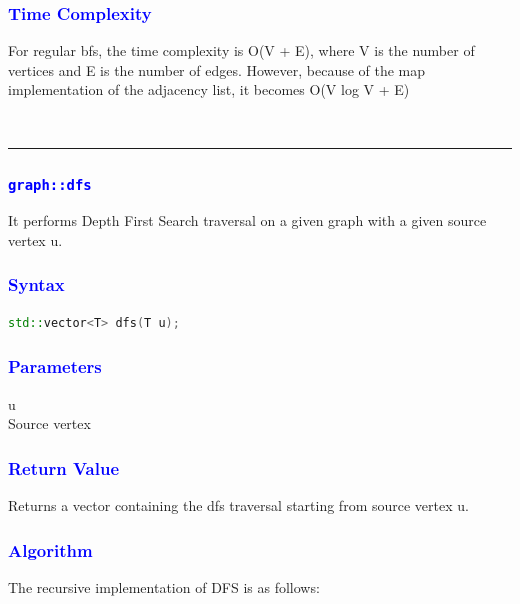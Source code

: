 \documentclass[11pt,a4paper]{article}
\begin{document}
\subsubsection*{\textcolor{blue}{ \large {Time Complexity}}}
For regular bfs, the time complexity is O(V + E), where V is the number of vertices and E is the number of edges. However, because of the map implementation of the adjacency list, it becomes O(V log V + E)


\\
\rule{17cm}{0.1mm}



\subsubsection*{\textcolor{blue}{ \Large \texttt{graph::dfs}}}
It performs Depth First Search traversal on a given graph with a given source vertex u.

\subsubsection*{\textcolor{blue}{ \large {Syntax}}}
\begin{lstlisting}[language=C++]
std::vector<T> dfs(T u);


\end{lstlisting}
\subsubsection*{\textcolor{blue}{ \large {Parameters
}}}
u\\
Source vertex


\subsubsection*{\textcolor{blue}{ \large {Return Value}}}
Returns a vector containing the dfs traversal starting from source vertex u.


\subsubsection*{\textcolor{blue}{ \large {Algorithm}}}
The recursive implementation of DFS is as follows:
\end{document}
